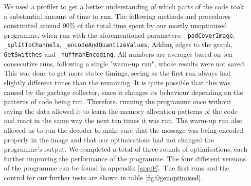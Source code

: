We used a profiler to get a better understanding of which parts of the code took a substantial amount of time to run.
The following methods and procedures constituted around 90\% of the total time spent by our mostly unoptimised programme, when run with the aforementioned parameters:
\lstinline|_padCoverImage|, \lstinline|_splitToChannels|, \lstinline|_encodeAndQuantizeValues|, Adding edges to the graph, \lstinline|GetSwitches| and \lstinline|_huffmanEncoding|.
All numbers are averages based on ten consecutive runs, following a single "warm-up run", whose results were not saved.
This was done to get more stable timings, seeing as the first run always had slightly different times than the remaining.
It is quite possible that this was caused by the garbage collector, since it changes its behaviour depending on the patterns of code being run.
Therefore, running the programme once without saving the data allowed it to learn the memory allocation patterns of the code and react in the same way the next ten times it was run.
The warm-up run also allowed us to run the decoder to make sure that the message was being encoded properly in the image and that our optimisations had not changed the programme's output.
We completed a total of three rounds of optimisations, each further improving the performance of the programme.
The four different versions of the programme can be found in appendix \ref{app:E}.
The first runs and the control for our further tests are shown in table \ref{fig:0genoptimised}.

